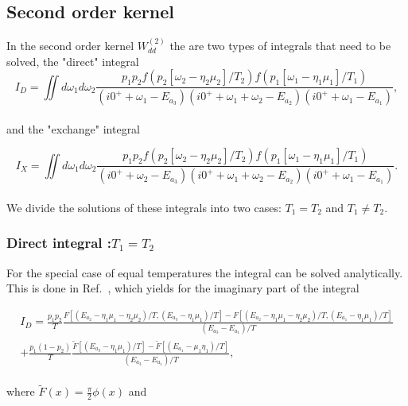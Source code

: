 \documentclass{article}
\begin{document}
\subsection{Second order kernel}

In the second order kernel $W_{dd}^{(2)}$ the are two types of integrals that need to be solved, the "direct" integral
\\
\begin{equation}
    I_D = \iint d\omega_1 d\omega_2 \frac{p_1p_2f(p_2[\omega_2-\eta_2\mu_2]/T_2)f(p_1[\omega_1-\eta_1\mu_1]/T_1)}{(i0^++\omega_1-E_{a_3})(i0^++\omega_1 + \omega_2-E_{a_2})(i0^++\omega_1-E_{a_1})},
\end{equation}
\\
and the "exchange" integral 

\begin{equation}
    I_X = \iint d\omega_1d\omega_2 \frac{p_1p_2f(p_2[\omega_2-\eta_2\mu_2]/T_2)f(p_1[\omega_1-\eta_1\mu_1]/T_1)}{(i0^++\omega_2-E_{a_3})(i0^++\omega_1 + \omega_2-E_{a_2})(i0^++\omega_1-E_{a_1})}.
\end{equation}
\\
We divide the solutions of these integrals into two cases: $T_1=T_2$ and $T_1\ne T_2$.
\subsubsection{Direct integral :$T_1=T_2$}

For the special case of equal temperatures the integral can be solved analytically. This is done in Ref.~\cite{leijnse2008kinetic}, which yields for the imaginary part of the integral

\begin{equation}
\begin{split}
    I_D = \frac{p_1p_2}{T}\frac{F\left [(E_{a_2}-\eta_1\mu_1-\eta_2\mu_2)/T, (E_{a_3}-\eta_1\mu_1)/T\right]- F\left[(E_{a_2}-\eta_1\mu_1-\eta_2\mu_2)/T, (E_{a_1}-\eta_1\mu_1)/T\right]}{(E_{a_3}-E_{a_1})/T} \\
    +\frac{p_1(1-p_2)}{T}\frac{\tilde{F}\left [(E_{a_3}-\eta_1\mu_1)/T\right ] - \tilde{F}\left [ (E_{a_1}-\mu_1\eta_1)/T \right] }{(E_{a_3}-E_{a_1})/T},
\end{split}
\end{equation}
\\
where $\tilde{F}(x)=\frac{\pi}{2}\phi(x)$ and 
\end{document}
